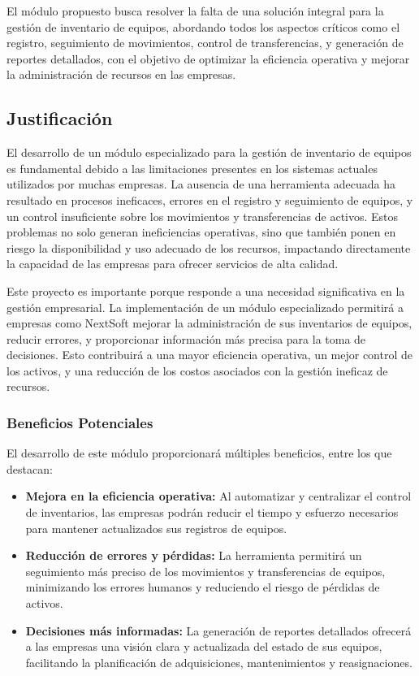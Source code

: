 \documentclass[stu, 12pt, letterpaper, donotrepeattitle, floatsintext, natbib]{apa7}
\begin{document}
El módulo propuesto busca resolver la falta de una solución integral para la gestión de inventario de equipos, abordando todos los aspectos
críticos como el registro, seguimiento de movimientos, control de transferencias, y generación de reportes detallados, con el objetivo de
optimizar la eficiencia operativa y mejorar la administración de recursos en las empresas.
\subsection{Justificación}
El desarrollo de un módulo especializado para la gestión de inventario de equipos es fundamental debido a las limitaciones presentes en los
sistemas actuales utilizados por muchas empresas. La ausencia de una herramienta adecuada ha resultado en procesos ineficaces, errores en el
registro y seguimiento de equipos, y un control insuficiente sobre los movimientos y transferencias de activos. Estos problemas no solo
generan ineficiencias operativas, sino que también ponen en riesgo la disponibilidad y uso adecuado de los recursos, impactando directamente
la capacidad de las empresas para ofrecer servicios de alta calidad.

Este proyecto es importante porque responde a una necesidad significativa en la gestión empresarial. La implementación de un módulo
especializado permitirá a empresas como NextSoft mejorar la administración de sus inventarios de equipos, reducir errores, y proporcionar
información más precisa para la toma de decisiones. Esto contribuirá a una mayor eficiencia operativa, un mejor control de los activos, y una
reducción de los costos asociados con la gestión ineficaz de recursos.
\subsubsection{Beneficios Potenciales}
El desarrollo de este módulo proporcionará múltiples beneficios, entre los que destacan:
\begin{itemize}
    \item\textbf{Mejora en la eficiencia operativa:} Al automatizar y centralizar el control de inventarios, las empresas podrán reducir el
          tiempo y esfuerzo necesarios para mantener actualizados sus registros de equipos.
    \item\textbf{Reducción de errores y pérdidas:} La herramienta permitirá un seguimiento más preciso de los movimientos y transferencias de
          equipos, minimizando los errores humanos y reduciendo el riesgo de pérdidas de activos.
    \item\textbf{Decisiones más informadas:} La generación de reportes detallados ofrecerá a las empresas una visión clara y actualizada del
          estado de sus equipos, facilitando la planificación de adquisiciones, mantenimientos y reasignaciones.
\end{itemize}
\end{document}
